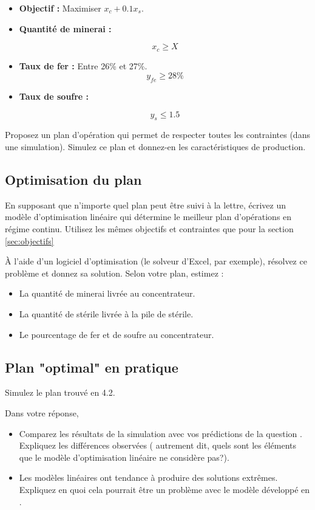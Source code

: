 \begin{itemize}
	\item \textbf{Objectif : } Maximiser $x_c + 0.1 x_s$.
	\item \textbf{Quantité de minerai : } 
	
	\[x_c \geq X\]
	
	\item \textbf{Taux de fer : } Entre 26\% et 27\%.
	\[ y_{fe} \geq 28\% \]
	
	\item \textbf{Taux de soufre : } 
	
	\[y_s \leq 1.5\]
	
\end{itemize}

Proposez un plan d'opération qui permet de respecter toutes les contraintes (dans une simulation). Simulez ce plan et donnez-en les caractéristiques de production.

\subsection{Optimisation du plan}

En supposant que n'importe quel plan peut être suivi à la lettre, écrivez un modèle d'optimisation linéaire qui détermine le meilleur plan d'opérations en régime continu. Utilisez les mêmes objectifs et contraintes que pour la section \ref{sec:objectifs}

À l'aide d'un logiciel d'optimisation (le solveur d'Excel, par exemple), résolvez ce problème et donnez sa solution. Selon votre plan, estimez :

\begin{itemize}
	\item La quantité de minerai livrée au concentrateur.
	\item La quantité de stérile livrée à la pile de stérile.
	\item Le pourcentage de fer et de soufre au concentrateur.
\end{itemize}


\subsection{Plan "optimal" en pratique}

Simulez le plan trouvé en 4.2. 

Dans votre réponse, 

\begin{itemize}
	\item Comparez les résultats de la simulation avec vos prédictions de la question . Expliquez les différences observées ( autrement dit, quels sont les éléments que le modèle d'optimisation linéaire ne considère pas?).
	\item Les modèles linéaires ont tendance à produire des solutions extrêmes. Expliquez en quoi cela pourrait être un problème avec le modèle développé en .
\end{itemize}

